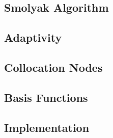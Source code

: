 \subsection{Smolyak Algorithm} 


\subsection{Adaptivity}


\subsection{Collocation Nodes}


\subsection{Basis Functions}


\subsection{Implementation}

